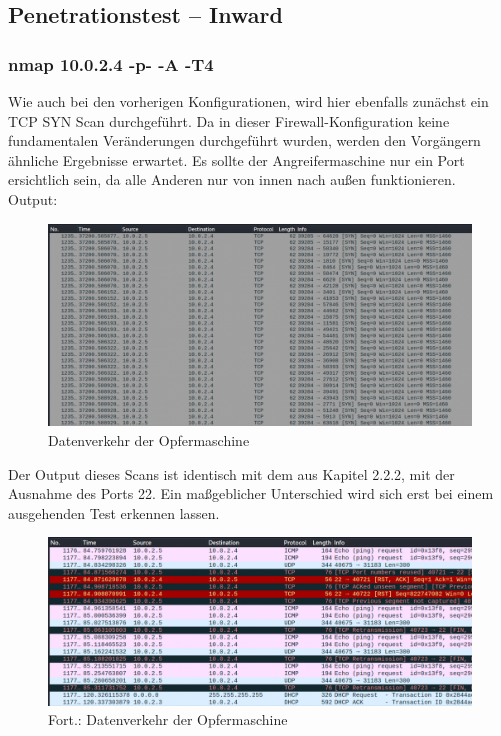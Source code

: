 \subsection{Penetrationstest – Inward}
\subsubsection{nmap 10.0.2.4 -p- -A -T4}
Wie auch bei den vorherigen Konfigurationen, wird hier ebenfalls zunächst ein TCP SYN Scan durchgeführt. Da in dieser Firewall-Konfiguration keine fundamentalen Veränderungen durchgeführt wurden, werden den Vorgängern ähnliche Ergebnisse erwartet. Es sollte der Angreifermaschine nur ein Port ersichtlich sein, da alle Anderen nur von innen nach außen funktionieren. \\
Output:
\begin{figure}
	\includegraphics[width=\linewidth]{img/ws_firewall_standard.png}
	\caption{Datenverkehr der Opfermaschine}
	\label{fig:ws_firewall_standard}
\end{figure}



Der Output dieses Scans ist identisch mit dem aus Kapitel 2.2.2, mit der Ausnahme des Ports 22. Ein maßgeblicher Unterschied wird sich erst bei einem ausgehenden Test erkennen lassen.

\begin{figure}
	\includegraphics[width=\linewidth]{img/ws_firewall_standard_2.png}
	\caption{Fort.: Datenverkehr der Opfermaschine}
	\label{fig:ws_firewall_standard_2}
\end{figure}

